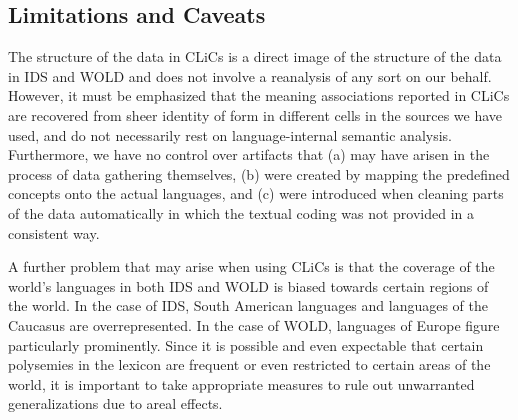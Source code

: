 \subsection{Limitations and Caveats} \label{caveats}
The structure of the data in CLiCs is a direct image of the structure of the data in IDS and WOLD
and does not involve a reanalysis of any sort on our behalf. However, it must be emphasized that the
meaning associations reported in CLiCs are recovered from sheer identity of form in different cells
in the sources we have used, and do not necessarily rest on language-internal semantic analysis.
Furthermore, we have no control over artifacts that (a) may have arisen in the process of data
gathering themselves, (b) were created by mapping the predefined concepts onto the actual languages,
and (c) were introduced when cleaning parts of the data automatically in which the textual coding
was not provided in a consistent way.
 
A further problem that may arise when using CLiCs is that the coverage of the world’s languages in
both IDS and WOLD is biased towards certain regions of the world. In the case of IDS, South American
languages and languages of the Caucasus are overrepresented. In the case of WOLD, languages of
Europe figure particularly prominently. Since it is possible and even expectable that certain
polysemies in the lexicon are frequent or even restricted to certain areas of the world, it is
important to take appropriate measures to rule out unwarranted generalizations due to areal
effects.


